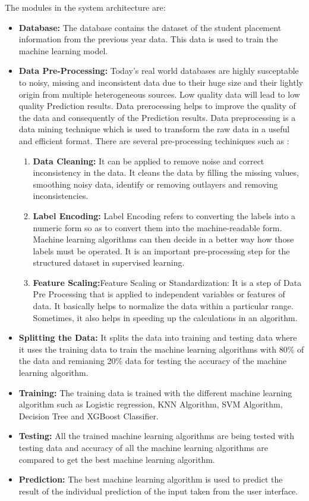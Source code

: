 \documentclass[12pt]{article}
\begin{document}
The modules in the system architecture are:
\begin{itemize}

\item \textbf{Database:} The database contains the dataset of the student placement information from the previous year data. This data is used to train the machine learning model. 

\item \textbf{Data Pre-Processing:} 
Today's real world databases are highly susceptable to noisy, missing and inconsistent data due to their huge size and their lightly origin from multiple heterogeneous sources. Low quality data will lead to low quality Prediction results. Data prerocessing helps to improve the quality of the data and consequently of the Prediction results. Data preprocessing is a data mining technique which is used to transform the raw data in a useful and efficient format. There are several pre-processing techiniques such as :
\begin{enumerate}
\item \textbf{Data Cleaning:} It can be applied to remove noise and correct inconsistency in the data. It cleans the data by filling the missing values, smoothing noisy data, identify or removing outlayers and removing inconsistencies.
\item \textbf{Label Encoding:}
Label Encoding refers to converting the labels into a numeric form so as to convert them into the machine-readable form. Machine learning algorithms can then decide in a better way how those labels must be operated. It is an important pre-processing step for the structured dataset in supervised learning.
\item \textbf{Feature Scaling:}Feature Scaling or Standardization: It is a step of Data Pre Processing that is applied to independent variables or features of data. It basically helps to normalize the data within a particular range. Sometimes, it also helps in speeding up the calculations in an algorithm.
\end{enumerate}
\item \textbf{Splitting the Data:}
It splits the data into training and testing data where it uses the training data to train the machine learning algorithms with 80\% of the data and remianing 20\% data for testing the accuracy of the machine learning algorithm.
\item \textbf{Training:}
The training data is trained with the different machine learning algorithm such as Logistic regression, KNN Algorithm, SVM Algorithm, Decision Tree and XGBoost Classifier.
\item \textbf{Testing:} All the trained machine learning algorithms are being tested with testing data and accuracy of all the machine learning algorithms are compared to get the best machine learning algorithm.
\item \textbf{Prediction:} The best machine learning algorithm is used to predict the result of the individual prediction of the input taken from the user interface.
\end{itemize}
\end{document}
